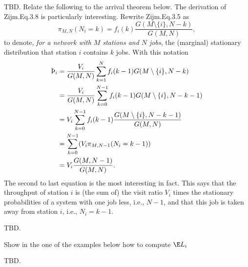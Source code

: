 \begin{question}
TBD. Relate the following to the arrival theorem below.  The derivation of
Zijm.Eq.3.8 is particularly interesting. Rewrite Zijm.Eq.3.5 as
\begin{equation*}
  \pi_{M,N}(N_i=k) = f_i(k)\frac{G(M\setminus\{i\}, N-k)}{G(M,N)},
\end{equation*}
to denote, \emph{ for a network with $M$ stations and $N$ jobs}, the
(marginal) stationary distribution that station $i$ contains $k$ jobs. With this notation
\begin{equation*}
  \begin{split}
    \TH_i 
&= \frac{V_i}{G(M,N)} \sum_{k=1}^{N}f_i(k-1) G(M\setminus\{i\}, N-k) \\
&= \frac{V_i}{G(M,N)} \sum_{k=0}^{N-1}f_i(k-1) G(M\setminus\{i\}, N-k-1) \\
&= V_i \sum_{k=0}^{N-1}f_i(k-1) \frac{G(M\setminus\{i\}, N-k-1)}{G(M,N)} \\
&= \sum_{k=0}^{N-1} (V_i \pi_{M,N-1}(N_i=k-1)) \\
&= V_i \frac{G(M,N-1)}{G(M,N)}.
  \end{split}
\end{equation*}
The second to last equation is the most interesting in fact. This says
that the throughput of station $i$ is (the sum of) the visit ratio
$V_i$ times the stationary probabilities of a system with one job
less, i.e., $N-1$, and that this job is taken away from station $i$,
i.e., $N_i=k-1$.  
  \begin{solution}
    TBD.
  \end{solution}
\end{question}


\begin{question}[use=false]
  Show in the one of the examples below how to compute $\E L_i$
  \begin{solution}
    TBD.
  \end{solution}
\end{question}


